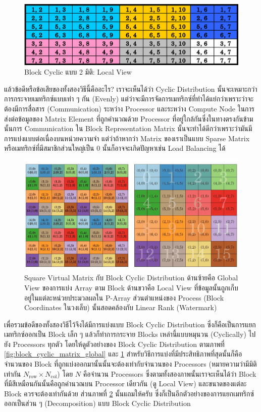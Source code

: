\begin{figure}[htbp]
  \centering
  \includegraphics[width=0.7\linewidth]{fig/block_cyclic_matrix_local.png}
  \caption{Block Cyclic แบบ 2 มิติ: Local View}
  \label{fig:block_cyclic_matrix_local}
\end{figure}

แล้วข้อดีหรือข้อเสียของทั้งสองวิธีนี้คืออะไร? เราจะเห็นได้ว่า Cyclic Distribution นั้นจะเหมาะกว่าการกระจายเมทริกซ์แบบเท่า ๆ กัน (Evenly)
แต่ว่าจะมีการจัดการเมทริกซ์ที่ทำได้แย่กว่าเพราะว่าจะต้องมีการสื่อสาร (Communication) ระหว่าง Processor และระหว่าง Compute Node
ในการส่งต่อข้อมูลของ Matrix Element ที่ถูกคำนวณด้วย Processor ที่อยู่ใกล้กันซึ่งในทางตรงกันข้ามนั้นการ Communication ใน Block
Representation Matrix นั้นจะทำได้ดีกว่าเพราะว่ามันมีการแบ่งแบบต่อเนื่องบนหน่วยความจำ แต่ว่าถ้าหากว่า Matrix ของเราเป็นแบบ Sparse
Matrix หรือเมทริกซ์ที่มีสมาชิกส่วนใหญ่เป็น 0 นั้นก็อาจจะเกิดปัญหาเช่น Load Balancing ได้

\begin{figure}[htbp]
  \centering
  \includegraphics[width=0.7\linewidth]{fig/square_virtual_matrix.png}
  \caption{Square Virtual Matrix กับ Block Cyclic Distribution ด้านซ้ายคือ Global View ของการแบ่ง Array ตาม Block
    ด้านขวาคือ Local View ที่ข้อมูลนั้นถูกเก็บอยู่ในแต่ละหน่วยประมวลผลใน P-Array ส่วนตำแหน่งของ Process (Block Coordinates
    ในวงเล็บ) นั้นสอดคล้องกับ Linear Rank (Watermark)}
  \label{fig:square_virtual_matrix}
\end{figure}

เพื่อรวมข้อดีของทั้งสองวิธีไว้จึงได้มีการแบ่งแบบ Block Cyclic Distribution ซึ่งก็คือเป็นการแยกเมทริกซ์ออกเป็น Block เล็ก ๆ แล้วก็ทำการกระจาย
Blocks เหล่านี้แบบหมุนวน (Cyclically) ไปยัง Processors ทุกตัว โดยให้ดูตัวอย่างของ Block Cyclic Distribution ตามภาพที่
\ref{fig:block_cyclic_matrix_global} และ \ref{fig:block_cyclic_matrix_local}
สำหรับวิธีการแบ่งที่มีประสิทธิภาพที่สุดนั้นก็คือจำนวนของ Block ที่ถูกแบ่งออกมานั้นนั้นจะต้องเท่ากับจำนวนของ Processors
(หมายความว่ามีมิติเท่ากัน $N_{\text{row}} \times N_{\text{col}}$) โดย $N$ คือจำนวน Processors ซึ่งตามทั้งสองภาพนั้นเราจะเห็นได้ว่า
Block ที่มีสีเหมือนกันนั้นคือถูกคำนวณบน Processor เดียวกัน (ดู Local View) และขนาดของแต่ละ Block ควรจะต้องเท่ากันด้วย ส่วนภาพที่
\ref{fig:square_virtual_matrix} นั้นแถมให้ครับ ซึ่งก็เป็นอีกตัวอย่างของการแยกเมทริกซ์ออกเป็นส่วน ๆ (Decomposition) แบบ Block
Cyclic Distribution

